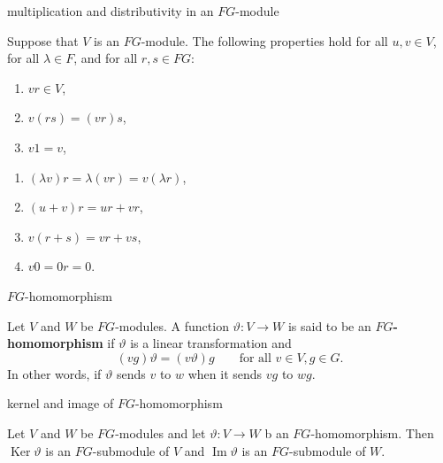 \documentclass[avery5371,grid]{flashcards}
\newcounter{mytemp}
\renewcommand{\theta}{\vartheta}
\DeclareMathOperator{\Ker}{\ensuremath{\textrm{Ker}}}
\DeclareMathOperator{\Img}{\ensuremath{\textrm{Im}}}
\newcommand{\defn}[1]{\textbf{#1}}
\begin{document}
\begin{flashcard}[Proposition 6.10]{multiplication and distributivity
    in an $FG$-module}

  Suppose that $V$ is an $FG$-module. The following properties hold
  for all $u, v \in V$, for all $\lambda \in F$, and for all
  $r, s \in FG$:

  \begin{minipage}{0.4\linewidth}
    \begin{enumerate}
    \item $vr \in V$,
    \item $v(rs) = (vr)s$,
    \item $v1 = v$,
      \setcounter{mytemp}{\value{enumi}}
    \end{enumerate}
  \end{minipage}%
  \begin{minipage}{0.6\linewidth}
    \begin{enumerate}
      \setcounter{enumi}{\value{mytemp}}
    \item $(\lambda v)r = \lambda (vr) = v(\lambda r)$,
    \item $(u + v)r = ur + vr$,
    \item $v(r + s) = vr + vs$,
    \item $v0 = 0r = 0$.
    \end{enumerate}
  \end{minipage}
\end{flashcard}

\begin{flashcard}[Definition 7.1]{$FG$-homomorphism}

  Let $V$ and $W$ be $FG$-modules. A function $\theta: V \to W$ is
  said to be an \defn{$FG$-homomorphism} if $\theta$ is a linear
  transformation and
  \[
    (vg)\theta = (v \theta)g \qquad \text{for all } v \in V, g \in G.
  \]
  In other words, if $\theta$ sends $v$ to $w$ when it sends $vg$ to
  $wg$.

\end{flashcard}

\begin{flashcard}[Propostion 7.2]{kernel and image of $FG$-homomorphism}

  Let $V$ and $W$ be $FG$-modules and let $\theta : V \to W$ b an
  $FG$-homomorphism. Then $\Ker \theta$ is an $FG$-submodule of $V$
  and $\Img \theta$ is an $FG$-submodule of $W$.

\end{flashcard}
\end{document}
